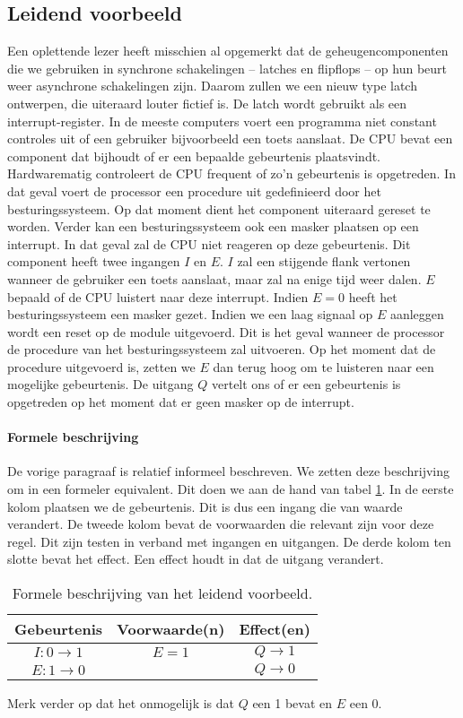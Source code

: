 \subsection{Leidend voorbeeld}
Een oplettende lezer heeft misschien al opgemerkt dat de geheugencomponenten die we gebruiken in synchrone schakelingen -- latches en flipflops -- op hun beurt weer asynchrone schakelingen zijn. Daarom zullen we een nieuw type latch ontwerpen, die uiteraard louter fictief is. De latch wordt gebruikt als een interrupt-register. In de meeste computers voert een programma niet constant controles uit of een gebruiker bijvoorbeeld een toets aanslaat. De CPU bevat een component dat bijhoudt of er een bepaalde gebeurtenis plaatsvindt. Hardwarematig controleert de CPU frequent of zo'n gebeurtenis is opgetreden. In dat geval voert de processor een procedure uit gedefinieerd door het besturingssysteem. Op dat moment dient het component uiteraard gereset te worden. Verder kan een besturingssysteem ook een masker plaatsen op een interrupt. In dat geval zal de CPU niet reageren op deze gebeurtenis. Dit component heeft twee ingangen $I$ en $E$. $I$ zal een stijgende flank vertonen wanneer de gebruiker een toets aanslaat, maar zal na enige tijd weer dalen. $E$ bepaald of de CPU luistert naar deze interrupt. Indien $E=0$ heeft het besturingssysteem een masker gezet. Indien we een laag signaal op $E$ aanleggen wordt een reset op de module uitgevoerd. Dit is het geval wanneer de processor de procedure van het besturingssysteem zal uitvoeren. Op het moment dat de procedure uitgevoerd is, zetten we $E$ dan terug hoog om te luisteren naar een mogelijke gebeurtenis. De uitgang $Q$ vertelt ons of er een gebeurtenis is opgetreden op het moment dat er geen masker op de interrupt.
\paragraph{Formele beschrijving}
De vorige paragraaf is relatief informeel beschreven. We zetten deze beschrijving om in een formeler equivalent. Dit doen we aan de hand van tabel \ref{tbl:formalDescriptionAsyncExample}. In de eerste kolom plaatsen we de gebeurtenis. Dit is dus een ingang die van waarde verandert. De tweede kolom bevat de voorwaarden die relevant zijn voor deze regel. Dit zijn testen in verband met ingangen en uitgangen. De derde kolom ten slotte bevat het effect. Een effect houdt in dat de uitgang verandert.
\begin{table}[hbt]
\centering
\begin{tabular}{c|c|c}
Gebeurtenis&Voorwaarde(n)&Effect(en)\\\hline
$I:0\rightarrow 1$&$E=1$&$Q\rightarrow 1$\\
$E:1\rightarrow 0$&&$Q\rightarrow 0$
\end{tabular}
\caption{Formele beschrijving van het leidend voorbeeld.}
\label{tbl:formalDescriptionAsyncExample}
\end{table}
Merk verder op dat het onmogelijk is dat $Q$ een 1 bevat en $E$ een 0.
